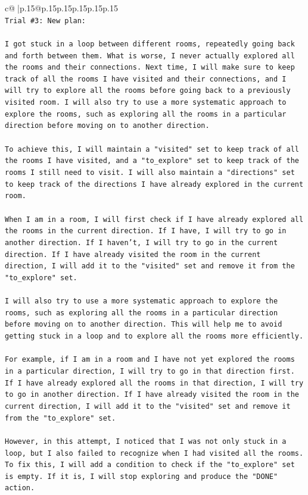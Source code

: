 \documentclass{article}
\begin{document}
{\begin{supertabular}{c@{$\;$}|p{.15\linewidth}@{}p{.15\linewidth}p{.15\linewidth}p{.15\linewidth}p{.15\linewidth}p{.15\linewidth}}
{{{\\ 
\texttt{Trial \#3: New plan: } \\
\\ 
\texttt{I got stuck in a loop between different rooms, repeatedly going back and forth between them. What is worse, I never actually explored all the rooms and their connections. Next time, I will make sure to keep track of all the rooms I have visited and their connections, and I will try to explore all the rooms before going back to a previously visited room. I will also try to use a more systematic approach to explore the rooms, such as exploring all the rooms in a particular direction before moving on to another direction.} \\
\\ 
\texttt{To achieve this, I will maintain a "visited" set to keep track of all the rooms I have visited, and a "to\_explore" set to keep track of the rooms I still need to visit. I will also maintain a "directions" set to keep track of the directions I have already explored in the current room.} \\
\\ 
\texttt{When I am in a room, I will first check if I have already explored all the rooms in the current direction. If I have, I will try to go in another direction. If I haven't, I will try to go in the current direction. If I have already visited the room in the current direction, I will add it to the "visited" set and remove it from the "to\_explore" set.} \\
\\ 
\texttt{I will also try to use a more systematic approach to explore the rooms, such as exploring all the rooms in a particular direction before moving on to another direction. This will help me to avoid getting stuck in a loop and to explore all the rooms more efficiently.} \\
\\ 
\texttt{For example, if I am in a room and I have not yet explored the rooms in a particular direction, I will try to go in that direction first. If I have already explored all the rooms in that direction, I will try to go in another direction. If I have already visited the room in the current direction, I will add it to the "visited" set and remove it from the "to\_explore" set.} \\
\\ 
\texttt{However, in this attempt, I noticed that I was not only stuck in a loop, but I also failed to recognize when I had visited all the rooms. To fix this, I will add a condition to check if the "to\_explore" set is empty. If it is, I will stop exploring and produce the "DONE" action.} \\
}}}
\end{supertabular}}
\end{document}
